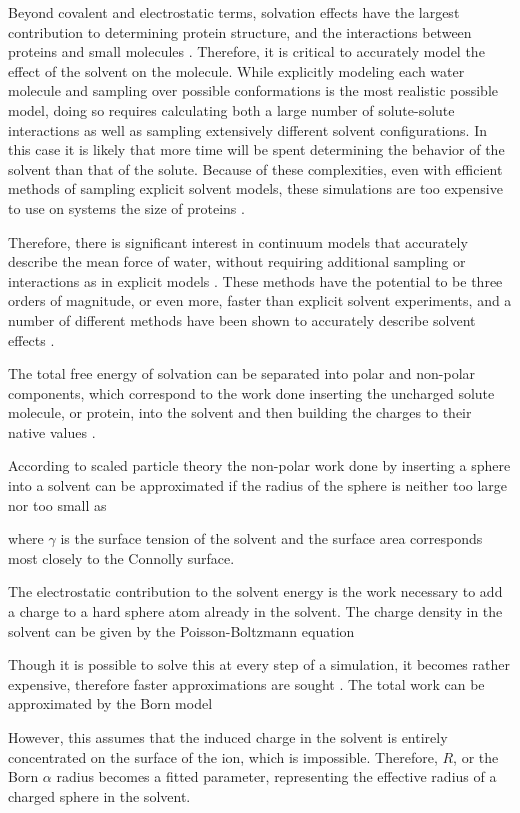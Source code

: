 Beyond covalent and electrostatic terms, solvation effects have the largest contribution to determining protein structure, and the interactions between proteins and small molecules \cite{chothia1975principles,janin1978conformation}.
Therefore, it is critical to accurately model the effect of the solvent on the molecule.
While explicitly modeling each water molecule and sampling over possible conformations is the most realistic possible model, doing so requires calculating both a large number of solute-solute interactions as well as sampling extensively different solvent configurations.
In this case it is likely that more time will be spent determining the behavior of the solvent than that of the solute.
Because of these complexities, even with efficient methods of sampling explicit solvent models, these simulations are too expensive to use on systems the size of proteins \cite{figueirido1997large,zhang2001solvent}.

Therefore, there is significant interest in continuum models that accurately describe the mean force of water, without requiring additional sampling or interactions as in explicit models \cite{zhang2001solvent,still1990semianalytical,qiu1997gb}.
These methods have the potential to be three orders of magnitude, or even more, faster than explicit solvent experiments, and a number of different methods have been shown to accurately describe solvent effects \cite{zhang2001solvent}.

The total free energy of solvation can be separated into polar and non-polar components, which correspond to the work done inserting the uncharged solute molecule, or protein, into the solvent and then building the charges to their native values \cite{roux1999implicit}.

According to scaled particle theory the non-polar work done by inserting a sphere into a solvent can be approximated if the radius of the sphere is neither too large nor too small as

where $\gamma$ is the surface tension of the solvent and the surface area corresponds most closely to the Connolly surface.

The electrostatic contribution to the solvent energy is the work necessary to add a charge to a hard sphere atom already in the solvent.
The charge density in the solvent can be given by the Poisson-Boltzmann equation

Though it is possible to solve this at every step of a simulation, it becomes rather expensive, therefore faster approximations are sought \cite{nicholls1991rapid}.
The total work can be approximated by the Born model

However, this assumes that the induced charge in the solvent is entirely concentrated on the surface of the ion, which is impossible.
Therefore, $R$, or the Born $\alpha$ radius becomes a fitted parameter, representing the effective radius of a charged sphere in the solvent.

